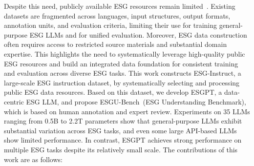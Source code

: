 \documentclass[11pt]{article}
\begin{document}
Despite this need, publicly available ESG resources remain limited~\cite{ong2025towards, lee2023esginfo, lee2024esgkor}. Existing datasets are fragmented across languages, input structures, output formats, annotation units, and evaluation criteria, limiting their use for training general-purpose ESG LLMs and for unified evaluation. Moreover, ESG data construction often requires access to restricted source materials and substantial domain expertise. This highlights the need to systematically leverage high-quality public ESG resources and build an integrated data foundation for consistent training and evaluation across diverse ESG tasks.
This work constructs \textsf{ESG-Instruct}, a large-scale ESG instruction dataset, by systematically selecting and processing public ESG data resources. Based on this dataset, we develop \textsf{ESGPT}, a data-centric ESG LLM, and propose \textsf{ESGU-Bench}~(ESG Understanding Benchmark), which is based on human annotation and expert review. Experiments on 35 LLMs ranging from 0.5B to 2.2T parameters show that general-purpose LLMs exhibit substantial variation across ESG tasks, and even some large API-based LLMs show limited performance. In contrast, \textsf{ESGPT} achieves strong performance on multiple ESG tasks despite its relatively small scale. The contributions of this work are as follows:
\end{document}
